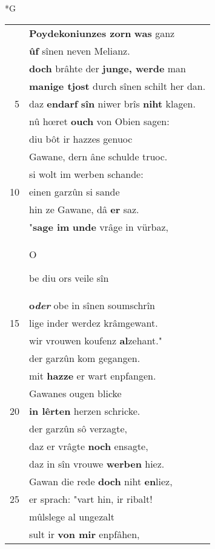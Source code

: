 \documentclass[8pt,a4paper,notitlepage]{article}
\begin{document}
\newpage
\begin{table}[ht]
\begin{minipage}[t]{0.5\linewidth}
\small
\begin{center}*G
\end{center}
\begin{tabular}{rl}
 & \textbf{Poydekoniunzes zorn} \textbf{was} ganz\\ 
 & \textbf{ûf} sînen neven Melianz.\\ 
 & \textbf{doch} brâhte der \textbf{junge, werde} man\\ 
 & \textbf{manige tjost} durch sînen schilt her dan.\\ 
5 & daz \textbf{en}\textbf{darf} \textbf{sîn} niwer brîs \textbf{niht} klagen.\\ 
 & nû hœret \textbf{ouch} von Obien sagen:\\ 
 & diu bôt ir hazzes genuoc\\ 
 & Gawane, dern âne schulde truoc.\\ 
 & si wolt im werben schande:\\ 
10 & einen garzûn si sande\\ 
 & hin ze Gawane, dâ \textbf{er} saz.\\ 
 & "\textbf{sage im} \textbf{unde} vrâge in vürbaz,\\ 
 & \begin{large}O\end{large}be diu ors veile sîn\\ 
 & \textbf{o\textit{der}} obe in sînen soumschrîn\\ 
15 & lige inder werdez krâmgewant.\\ 
 & wir vrouwen koufenz \textbf{al}zehant."\\ 
 & der garzûn kom gegangen.\\ 
 & mit \textbf{hazze} er wart enpfangen.\\ 
 & Gawanes ougen blicke\\ 
20 & \textbf{in lêrten} herzen schricke.\\ 
 & der garzûn sô verzagte,\\ 
 & daz er vrâgte \textbf{noch} ensagte,\\ 
 & daz in sîn vrouwe \textbf{werben} hiez.\\ 
 & Gawan die rede \textbf{doch} niht \textbf{en}liez,\\ 
25 & er sprach: "vart hin, ir ribalt!\\ 
 & mûlslege al ungezalt\\ 
 & sult ir \textbf{von mir} enpfâhen,\\ 

\end{tabular}
\end{minipage}
\end{table}
\end{document}
